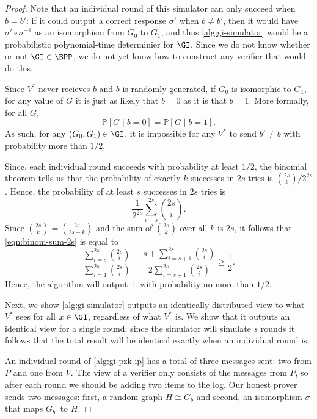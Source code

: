 \documentclass[english,12pt]{reedthesis}
\theoremstyle{plain}
\theoremstyle{definition}
\theoremstyle{remark}
\begin{document}
\begin{proof}
  Note that an individual round of this simulator can only succeed when
  $b = b'$: if it could output a correct response $\sigma'$ when $b \ne b'$, then it
  would have $\sigma' \circ \sigma^{-1}$ as an isomorphism from $G_{0}$ to $G_{1}$, and thus
  \cref{alg:gi-simulator} would be a probabilistic polynomial-time determinier
  for $\GI$. Since we do not know whether or not $\GI \in \BPP$, we do not yet
  know how to construct any verifier that would do this.

  Since $V^{*}$ never recieves $b$ and $b$ is randomly generated, if $G_{0}$ is
  isomorphic to $G_{1}$, for any value of $G$ it is just as likely that $b = 0$
  as it is that $b = 1$. More formally, for all $G$,
  \[
    \mathbb{P}[G \mid b = 0] = \mathbb{P}[G \mid b = 1].
  \]
  As such, for any $(G_{0}, G_{1}) \in \GI$, it is impossible for any $V^{*}$ to
  send $b' \ne b$ with probability more than $1/2$.

  Since, each individual round succeeds with probability at least $1/2$, the
  binomial theorem tells us that the probability of exactly $k$ successes in
  $2s$ tries is $\binom{2s}{k}/2^{2s}$. Hence, the probability of at least $s$
  successes in $2s$ tries is
  \begin{equation}\label{eqn:binom-sum-2s}
    \frac{1}{2^{2s}}\sum_{i=s}^{2s}\binom{2s}{i}.
  \end{equation}
  Since $\binom{2s}{k} = \binom{2s}{2s - k}$ and the sum of $\binom{2s}{k}$ over
  all $k$ is $2s$, it follows that \cref{eqn:binom-sum-2s} is equal to
  \begin{equation}
    \frac{\displaystyle \sum_{i=s}^{2s}\binom{2s}{i}}{\displaystyle \sum_{i=1}^{2s}\binom{2s}{i}}
    = \frac{\displaystyle s + \sum_{i=s+1}^{2s}\binom{2s}{i}}{2\displaystyle \sum_{i=s+1}^{2s}\binom{2s}{i}}
    \ge \frac{1}{2}.
  \end{equation}
  Hence, the algorithm will output $\bot$ with probability no more than $1/2$.

  Next, we show \cref{alg:gi-simulator} outputs an identically-distributed view
  to what $V^{*}$ sees for all $x \in \GI$, regardless of what $V^{*}$ is. We show
  that it outputs an identical view for a single round; since the simulator will
  simulate $s$ rounds it follows that the total result will be identical exactly
  when an individual round is.

  An individual round of \cref{alg:gi-pzk-ip} has a total of three messages
  sent: two from $P$ and one from $V$. The view of a verifier only consists of
  the messages from $P$, so after each round we should be adding two items to
  the log. Our honest prover sends two messages: first, a random graph
  $H \cong G_{b}$ and second, an isomorphism $\sigma$ that maps $G_{b'}$ to $H$.


\end{proof}
\end{document}
